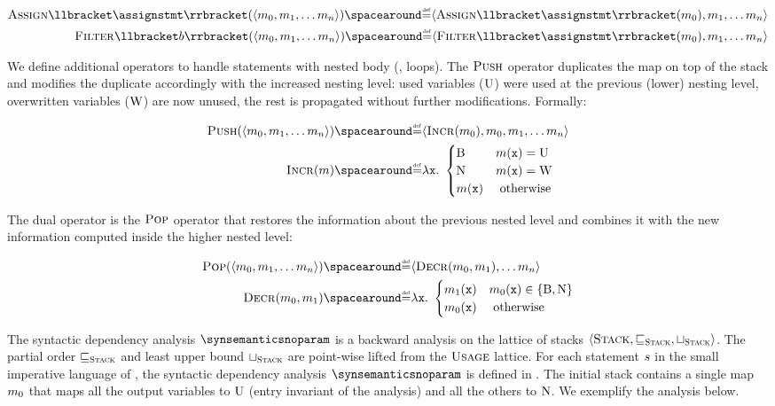 \begin{align*}
  \usageassign\semanticsof{\assignstmt}(\stacktuple{\usagemap_0}) \DefeQ
    \stacktuple{\usageassign\semanticsof{\assignstmt}(\usagemap_0)}
  \\
  \usagefilter\semanticsof{\defbexp}(\stacktuple{\usagemap_0}) \DefeQ
  \stacktuple{\usagefilter\semanticsof{\assignstmt}(\usagemap_0)}
\end{align*}

We define additional operators to handle statements with nested body (\eg, loops).
The $\textup{\textsc{Push}}$ operator duplicates the map on top of the stack and modifies the duplicate accordingly with the increased nesting level: used variables ($\textup{U}$) were used at the previous (lower) nesting level, overwritten variables ($\textup{W}$) are now unused, the rest is propagated without further modifications. Formally:

\begin{align*}
  \usagepush(\stacktupleinit) &\DefeQ \stacktuple{\usageincr(\usagemap_0), \usagemap_0} \\
  \usageincr(\usagemap) &\DefeQ \lambda \defvariable.\spacer \begin{cases}
    \belowtag & \usagemap(\defvariable) = \usedtag \\
    \unusedtag & \usagemap(\defvariable) = \overwrittentag \\
    \usagemap(\defvariable) & \text{ otherwise}
  \end{cases}
\end{align*}

The dual operator is the $\textup{\textsc{Pop}}$ operator that restores the information about the previous nested level and combines it with the new information computed inside the higher nested level:

\begin{align*}
  \usagepop(\stacktupleinit) &\DefeQ \stacktuple[]{\usagedecr(\usagemap_0, \usagemap_1)} \\
  \usagedecr(\usagemap_0, \usagemap_1) &\DefeQ \lambda \defvariable.\spacer \begin{cases}
    \usagemap_1(\defvariable) & \usagemap_0(\defvariable) \in \{ \belowtag, \unusedtag \} \\
    \usagemap_0(\defvariable) & \text{ otherwise}
  \end{cases}
\end{align*}

The syntactic dependency analysis $\synsemanticsnoparam$ is a backward analysis on the lattice of stacks $\langle\textsc{Stack}, \sqsubseteq_{\textsc{Stack}},\sqcup_{\textsc{Stack}}\rangle$. The partial order $\sqsubseteq_{\textsc{Stack}}$ and least upper bound $\sqcup_{\textsc{Stack}}$ are point-wise lifted from the $\textsc{Usage}$ lattice. For each statement $s$ in the small imperative language of , the syntactic dependency analysis $\synsemanticsnoparam$ is defined in .
The initial stack contains a single map $m_0$ that maps all the output variables to $\textup{U}$ (entry invariant of the analysis) and all the others to $\textup{N}$.
We exemplify the analysis below.

